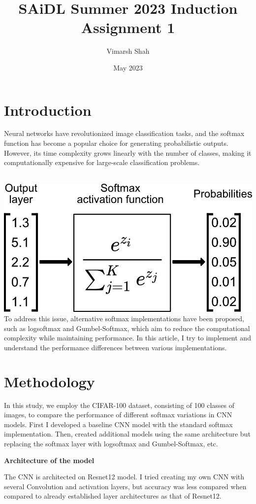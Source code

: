 \documentclass{article}
\title{SAiDL Summer 2023 Induction Assignment 1}
\author{Vimarsh Shah }
\date{May 2023}
\begin{document}
\maketitle

\section{Introduction}


Neural networks have revolutionized image classification tasks, and the softmax function has become a popular choice for generating probabilistic outputs. However, its time complexity grows linearly with the number of classes, making it computationally expensive for large-scale classification problems.

\\ 
\includegraphics[width=0.6\linewidth]{images/softmaxworkingsimple.jpg}
\\ 

To address this issue, alternative softmax implementations have been proposed, such as logsoftmax and Gumbel-Softmax, which aim to reduce the computational complexity while maintaining performance. In this article, I try to implement and understand the performance differences between various implementations.

\section{Methodology}


In this study, we employ the CIFAR-100 dataset, consisting of 100 classes of images, to compare the performance of different softmax variations in CNN models. First I developed a baseline CNN model with the standard softmax implementation. Then, created additional models using the same architecture but replacing the softmax layer with logsoftmax and Gumbel-Softmax, etc.

\textbf{Architecture of the model}


The CNN is architected on Resnet12 model. I tried creating my own CNN with several Convolution and activation layers, but accuracy was less compared when compared to already established layer architectures as that of Resnet12.
\end{document}
